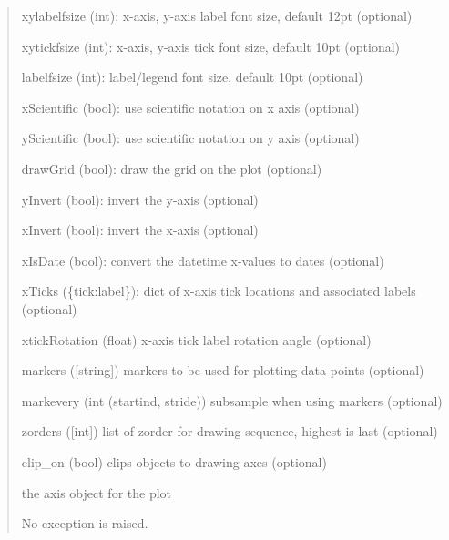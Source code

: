 \documentclass[a4paper,10pt,english]{sphinxmanual}
\begin{document}
\begin{fulllineitems}
\begin{fulllineitems}
\begin{quote}
\begin{description}
\begin{DUlineblock}{0em}
\item[] xylabelfsize (int): x-axis, y-axis label font size, default 12pt (optional)
\item[] xytickfsize (int): x-axis, y-axis tick font size, default 10pt (optional)
\item[] labelfsize (int): label/legend font size, default 10pt (optional)
\item[] xScientific (bool): use scientific notation on x axis (optional)
\item[] yScientific (bool): use scientific notation on y axis (optional)
\item[] drawGrid (bool): draw the grid on the plot (optional)
\item[] yInvert (bool): invert the y-axis (optional)
\item[] xInvert (bool): invert the x-axis (optional)
\item[] xIsDate (bool): convert the datetime x-values to dates (optional)
\item[] xTicks (\{tick:label\}): dict of x-axis tick locations and associated labels (optional)
\item[] xtickRotation (float) x-axis tick label rotation angle (optional) 
\item[] markers ({[}string{]}) markers to be used for plotting data points (optional)
\item[] markevery (int \textbar{} (startind, stride)) subsample when using markers (optional)
\item[] zorders ({[}int{]}) list of zorder for drawing sequence, highest is last (optional)
\item[] clip\_on (bool) clips objects to drawing axes (optional)
\end{DUlineblock}

\item[{Returns:}] \leavevmode
\begin{DUlineblock}{0em}
\item[] the axis object for the plot
\end{DUlineblock}

\item[{Raises:}] \leavevmode
\begin{DUlineblock}{0em}
\item[] No exception is raised.
\end{DUlineblock}

\end{description}
\end{quote}


\end{fulllineitems}
\end{fulllineitems}
\end{document}
